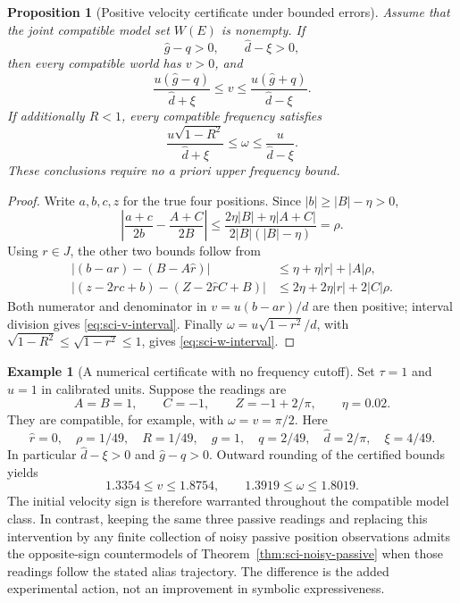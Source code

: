 \documentclass[11pt]{article}
\newtheorem{proposition}[theorem]{Proposition}
\theoremstyle{definition}
\newtheorem{example}[theorem]{Example}
\begin{document}
\begin{proposition}[Positive velocity certificate under bounded errors]
\label{prop:sci-noise-certificate}
Assume that the joint compatible model set $W(E)$ is nonempty. If
\[
 \widehat g-q>0,\qquad \widehat d-\xi>0,
\]
then every compatible world has $v>0$, and
\begin{equation}\label{eq:sci-v-interval}
 \frac{u(\widehat g-q)}{\widehat d+\xi}
 \leq v\leq
 \frac{u(\widehat g+q)}{\widehat d-\xi}.
\end{equation}
If additionally $R<1$, every compatible frequency satisfies
\begin{equation}\label{eq:sci-w-interval}
 \frac{u\sqrt{1-R^2}}{\widehat d+\xi}
 \leq\omega\leq\frac{u}{\widehat d-\xi}.
\end{equation}
These conclusions require no a priori upper frequency bound.
\end{proposition}
\begin{proof}
Write $a,b,c,z$ for the true four positions. Since $|b|\geq|B|-\eta>0$,
\[
 \left|\frac{a+c}{2b}-\frac{A+C}{2B}\right|
 \leq\frac{2\eta|B|+\eta|A+C|}
             {2|B|(|B|-\eta)}=\rho.
\]
Using $r\in J$, the other two bounds follow from
\begin{align*}
 |(b-ar)-(B-A\widehat r)|
 &\leq\eta+\eta|r|+|A|\rho,\\
 |(z-2rc+b)-(Z-2\widehat rC+B)|
 &\leq2\eta+2\eta|r|+2|C|\rho.
\end{align*}
Both numerator and denominator in $v=u(b-ar)/d$ are then positive;
interval division gives \eqref{eq:sci-v-interval}. Finally
$\omega=u\sqrt{1-r^2}/d$, with
$\sqrt{1-R^2}\leq\sqrt{1-r^2}\leq1$, gives
\eqref{eq:sci-w-interval}.
\end{proof}

\begin{example}[A numerical certificate with no frequency cutoff]
Set $\tau=1$ and $u=1$ in calibrated units. Suppose the readings are
\[
 A=B=1,\qquad C=-1,\qquad Z=-1+2/\pi,
 \qquad\eta=0.02.
\]
They are compatible, for example, with $\omega=v=\pi/2$.
Here
\[
 \widehat r=0,\quad \rho=1/49,\quad R=1/49,\quad
 \widehat g=1,\quad q=2/49,\quad
 \widehat d=2/\pi,\quad\xi=4/49.
\]
In particular $\widehat d-\xi>0$ and $\widehat g-q>0$. Outward rounding
of the certified bounds yields
\[
 1.3354\leq v\leq1.8754,\qquad
 1.3919\leq\omega\leq1.8019.
\]
The initial velocity sign is therefore warranted throughout the compatible
model class. In contrast, keeping the same three passive readings and
replacing this intervention by any finite collection of noisy passive
position observations admits the opposite-sign countermodels of
Theorem~\ref{thm:sci-noisy-passive} when those readings follow the stated
alias trajectory. The difference is the added experimental action, not
an improvement in symbolic expressiveness.
\end{example}
\end{document}
